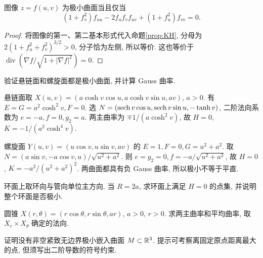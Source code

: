\begin{proposition}
图像 $z=f(u,v)$ 为极小曲面当且仅当
\begin{equation}\label{eq:minimal-graph}
 (1+f_v^2)f_{uu}-2f_uf_vf_{uv}+(1+f_u^2)f_{vv}=0.
\end{equation}
\end{proposition}
\begin{proof}
将图像的第一、第二基本形式代入命题\ref{prop:KH}, 分母为 $2(1+f_u^2+f_v^2)^{3/2}>0$, 分子恰为左侧, 所以等价. 这也等价于 $\operatorname{div}(\nabla f/\sqrt{1+|\nabla f|^2})=0$.
\end{proof}
\begin{example}
验证悬链面和螺旋面都是极小曲面, 并计算 Gauss 曲率.
\end{example}
\begin{solution}
悬链面取 $X(u,v)=(a\cosh v\cos u,a\cosh v\sin u,av)$, $a>0$. 有 $E=G=a^2\cosh^2v,F=0$. 选 $N=(\operatorname{sech} v\cos u,\operatorname{sech} v\sin u,-\tanh v)$, 二阶法向系数为 $e=-a,f=0,g_2=a$. 两主曲率为 $\mp1/(a\cosh^2v)$, 故 $H=0$, $K=-1/(a^2\cosh^4v)$.

螺旋面 $Y(u,v)=(u\cos v,u\sin v,av)$ 的 $E=1,F=0,G=u^2+a^2$. 取 $N=(a\sin v,-a\cos v,u)/\sqrt{u^2+a^2}$. 则 $e=g_2=0,f=-a/\sqrt{u^2+a^2}$, 故 $H=0$, $K=-a^2/(u^2+a^2)^2$. 两曲面都具有负 Gauss 曲率, 所以极小不等于平直.
\end{solution}
\begin{exercise}\label{ex:6a}
环面上取环向与管向单位主方向. 当 $R=2a$, 求环面上满足 $H=0$ 的点集, 并说明整个环面是否极小.
\end{exercise}
\begin{exercise}\label{ex:6b}
圆锥 $X(r,\theta)=(r\cos\theta,r\sin\theta,ar)$, $a>0$, $r>0$. 求两主曲率和平均曲率, 取 $X_r\times X_\theta$ 确定的法向.
\end{exercise}
\begin{exercise}\label{ex:6c}
证明没有非空紧致无边界极小嵌入曲面 $M\subset\mathbb R^3$. 提示可考察离固定原点距离最大的点, 但须写出二阶导数的符号约束.
\end{exercise}
